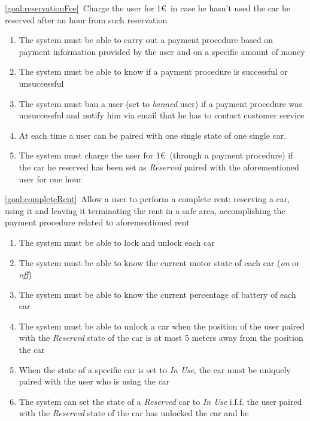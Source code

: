 \begin{description}
  		\item \ref{goal:reservationFee}\ Charge the user for 1\euro\ in case he hasn't used the car he reserved after an hour from such reservation
  			\begin{enumerate}[resume*]
  				\item The system must be able to carry out a payment procedure based on payment
  				information provided by the user and on a specific amount of money
  				\item The system must be able to know if a payment procedure is successful or
  				unsuccessful
  				\item The system must ban a user (set to \emph{banned} user) if a
  				payment procedure was unsuccessful and notify him via email that he has to
  				contact customer service
  				\item At each time a user can be paired with one single state of one single car.
  				\item The system must charge the user for 1\euro\ (through a payment procedure) if
  				the car he reserved has been set as \emph{Reserved} paired with the aforementioned
  				user for one hour
   			\end{enumerate}
  		\item \ref{goal:completeRent}\ Allow a user to perform a complete rent: reserving a car, using it and leaving it terminating the rent in a safe area, accomplishing the payment procedure related to aforementioned rent
  			\begin{enumerate}[resume*]
  				\item The system must be able to lock and unlock each car
  				\item The system must be able to know the current motor state of each car
  				(\emph{on} or \emph{off})
  				\item The system must be able to know the current percentage of battery of each car
  				\item The system must be able to unlock a car when the position of the user paired
  				with the
  				\emph{Reserved} state of the car is at most 5 meters away from the position the car
  				\item When the state of a specific car is set to \emph{In Use}, the car must be
 	  			uniquely paired with the user who is using the car
  				\item The system can set the state of a \emph{Reserved} car to \emph{In Use} i.f.f.
  				the user paired with the \emph{Reserved} state of the car has unlocked the car and he

\end{enumerate}
\end{description}
